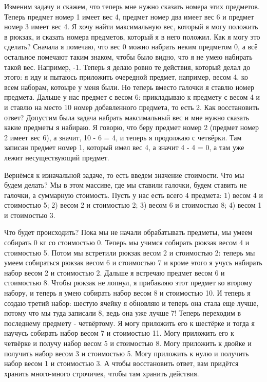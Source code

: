 \documentclass[12pt]{article}
\begin{document}
Изменим задачу и скажем, что теперь мне нужно сказать номера этих предметов. Теперь предмет номер 1 имеет вес 4, предмет номер два имеет вес 6 и предмет номер 3 имеет вес 4. Я хочу найти максимальную вес, который я могу положить в рюкзак, и сказать номера предметов, который я в него положил. Как я могу это сделать? Сначала я помечаю, что вес 0 можно набрать неким предметом 0, а всё остальное помечают таким знаком, чтобы было видно, что я не умею набирать такой вес. Например, -1. Теперь я делаю ровно те действия, который делал до этого: я иду и пытаюсь приложить очередной предмет, например, весом 4, ко всем наборам, котоыре у меня были. Но теперь вместо галочки я ставлю номер предмета. Дальше у нас предмет с весом 6: прикладываю к предмету с весом 4 и и ставлю на место 10 номер добавленного предмета, то есть 2. Как восстановить ответ? Допустим была задача набрать максимальный вес и мне нужно сказать какие предметы я набираю. Я говорю, что беру предмет номер 2 (предмет номер 2 имеет вес 6), а значит, 10 - 6 = 4, и теперь я продолжаю с четвёрки. Там записан предмет номер 1, который имел вес 4, а значит 4 - 4 = 0, а там уже лежит несуществующий предмет.

Вернёмся к изначальной задаче, то есть введем значение стоимости. Что мы будем делать? Мы в этом массиве, где мы ставили галочки, будем ставить не галочки, а суммарную стоимость. Пусть у нас есть всего 4 предмета: 1) весом 4 и стоимостью 5; 2) весом 2 и стоимостью 2; 3) весом 6 и стоимостью 8; 4) весом 1 и стоимостью 3. 

Что будет происходить? Пока мы не начали обрабатывать предметы, мы умеем собирать 0 кг со стоимостью 0. Теперь мы учимся собирать рюкзак весом 4 и стоимостью 5. Потом мы встретили рюкзак весом 2 и стоимостью 2: теперь мы умеем собираться рюкзак весом 6 и стоимостью 7 и кроме этого я учусь набирать набор весом 2 и стоимостью 2. Дальше я встречаю предмет весом 6 и стоимостью 8. Чтобы рюкзак не лопнул, я прибавляю этот предмет ко второму набору, и теперь я умею собирать набор весом 8 и стоимостью 10. И теперь я создаю третий набор: шестую ячейку я обновляю и теперь она стала еще лучше, потому что мы туда записали 8, ведь она уже лучше 7! Теперь переходим в последнему предмету - четвёртому. Я могу приложить его к шестёрке и тогда я научусь собирать набор весом 7 и стоимостью 11. Могу приложить его к четвёрке и получу набор весом 5 и стоимостью 8. Могу приложить к двойке и получить набор весом 3 и стоимостью 5. Могу приложить к нулю и получить набор весом 1 и стоимостью 3. А чтобы восстановить ответ, вам придётся хранить много-много строчичек, чтобы там хранить действия. 
\end{document}
